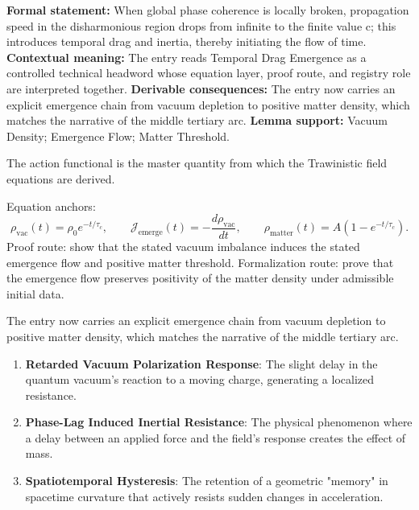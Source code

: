 \begingroup\footnotesize\setlength{\emergencystretch}{3em}\sloppy
\textbf{Formal statement:} When global phase coherence is locally broken, propagation speed in the disharmonious region drops from infinite to the finite value c; this introduces temporal drag and inertia, thereby initiating the flow of time. \textbf{Contextual meaning:} The entry reads Temporal Drag Emergence as a controlled technical headword whose equation layer, proof route, and registry role are interpreted together. \textbf{Derivable consequences:} The entry now carries an explicit emergence chain from vacuum depletion to positive matter density, which matches the narrative of the middle tertiary arc. \textbf{Lemma support:} Vacuum Density; Emergence Flow; Matter Threshold.\par
\endgroup

The action functional is the master quantity from which the Trawinistic field equations are derived.

Equation anchors:
\[
\rho_{\mathrm{vac}}(t)=\rho_0 e^{-t/\tau_c},\qquad
\mathcal{J}_{\mathrm{emerge}}(t)=-\frac{d\rho_{\mathrm{vac}}}{dt},\qquad
\rho_{\mathrm{matter}}(t)=A(1-e^{-t/\tau_c}).
\]
Proof route: show that the stated vacuum imbalance induces the stated emergence flow and positive matter threshold. Formalization route: prove that the emergence flow preserves positivity of the matter density under admissible initial data.

The entry now carries an explicit emergence chain from vacuum depletion to positive matter density, which matches the narrative of the middle tertiary arc.
\endgroup

\begin{enumerate}[leftmargin=1.6em,itemsep=6pt,topsep=4pt]
\item \textbf{Retarded Vacuum Polarization Response}: The slight delay in the quantum vacuum's reaction to a moving charge, generating a localized resistance.
\item \textbf{Phase-Lag Induced Inertial Resistance}: The physical phenomenon where a delay between an applied force and the field's response creates the effect of mass.
\item \textbf{Spatiotemporal Hysteresis}: The retention of a geometric "memory" in spacetime curvature that actively resists sudden changes in acceleration.
\end{enumerate}

